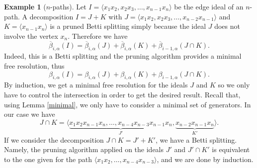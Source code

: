 \documentclass[12pt]{amsart}
\theoremstyle{definition}
\newtheorem{example}[theorem]{Example}
\theoremstyle{remark}
\numberwithin{equation}{section}
\begin{document}
\begin{example}[$n$-paths]\label{ex_npath}
Let $I=\langle
x_1x_2,x_2x_3,\dots,x_{n-1}x_n \rangle$ be the edge ideal of an
$n$-path. A decomposition $I=J+K$ with $J=\langle
x_1x_2,x_2x_3,\dots,x_{n-2}x_{n-1} \rangle$ and $K=\langle
x_{n-1}x_n \rangle$ is a pruned Betti splitting simply because the
ideal $J$ does not involve the vertex $x_n$. Therefore we have
$$\overline{\beta}_{i,\alpha}(I)= \overline{\beta}_{i,\alpha}(J)+\overline{\beta}_{i,\alpha}(K)+\overline{\beta}_{i-1,\alpha}(J\cap
K).$$ Indeed, this is a Betti splitting and the pruning algorithm
provides a minimal free resolution, thus
$${\beta}_{i,\alpha}(I)= {\beta}_{i,\alpha}(J)+{\beta}_{i,\alpha}(K)+{\beta}_{i-1,\alpha}(J\cap
K).$$ By induction, we get a minimal free resolution for the ideals
$J$ and $K$ so we only have to control the intersection in order to
get the desired result. Recall that, using Lemma \ref{minimal}, we
only have to consider a
 minimal set of generators. In our case we have
$$J\cap K=\langle \underbrace{x_1x_2x_{n-1}x_n, \dots,
x_{n-4}x_{n-3}x_{n-1}x_n}_{J'},\underbrace{x_{n-2}x_{n-1}x_n}_{K'}\rangle.
$$
If we consider the decomposition $J\cap K=J'+K'$, we have a Betti splitting.
Namely, the pruning algorithm applied on the ideals $J'$ and $J'\cap
K'$ is equivalent to the one given for the path $\langle x_1x_2,
\dots, x_{n-4}x_{n-3}\rangle$, and we are done by induction.
\end{example}


%

\vskip 2mm
\end{document}
